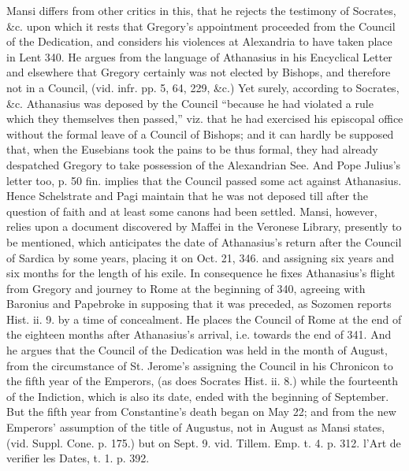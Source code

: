 Mansi differs from other
critics in this, that he rejects the testimony of Socrates, \&c.
upon which it rests that Gregory's appointment proceeded from the
Council of the Dedication, and considers his violences at Alexandria
to have taken place in Lent 340. He argues from the language of
Athanasius in his Encyclical Letter and elsewhere that Gregory
certainly was not elected by Bishops, and therefore not in a Council,
(vid. infr. pp. 5, 64, 229, \&c.) Yet surely, according to
Socrates, \&c. Athanasius was deposed by the Council “because he
had violated a rule which they themselves then passed,” viz. that he
had exercised his episcopal office without the formal leave of a
Council of Bishops; and it can hardly be supposed that, when the
Eusebians took the pains to be thus formal, they had already
despatched Gregory to take possession of the Alexandrian See. And Pope
Julius's letter too, p. 50 fin. implies that the Council passed some
act against Athanasius. Hence Schelstrate and Pagi maintain that he
was not deposed till after the question of faith and at least some
canons had been settled. Mansi, however, relies upon a document
discovered by Maffei in the Veronese Library, presently to be
mentioned, which anticipates the date of Athanasius's return after the
Council of Sardica by some years, placing it on Oct. 21, 346. and
assigning six years and six months for the length of his exile. In
consequence he fixes Athanasius's flight from Gregory and journey to
Rome at the beginning of 340, agreeing with Baronius and Papebroke
in supposing that it was preceded, as Sozomen reports Hist. ii.
9. by a time of concealment. He places the Council of Rome at the end
of the eighteen months after Athanasius's arrival, i.e. towards the
end of 341. And he argues that the Council of the Dedication was held
in the month of August, from the circumstance of St. Jerome's
assigning the Council in his Chronicon to the fifth year of the
Emperors, (as does Socrates Hist. ii. 8.) while the fourteenth of the
Indiction, which is also its date, ended with the beginning of
September. But the fifth year from Constantine's death began on May
22; and from the new Emperors' assumption of the title of Augustus,
not in August as Mansi states, (vid. Suppl. Cone. p. 175.) but on
Sept. 9. vid. Tillem. Emp. t. 4. p. 312. l'Art de verifier les Dates,
t. 1. p. 392.

